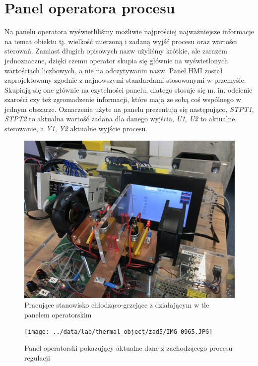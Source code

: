 \chapter{Panel operatora procesu}
\label{thermal_panel}
Na panelu operatora wyświetliliśmy możliwie najprościej najważniejsze informacje na temat obiektu tj. wielkość mierzoną i zadaną wyjść procesu oraz wartości sterowań. Zamiast długich opisowych nazw użyliśmy krótkie, ale zarazem jednoznaczne, dzięki czemu operator skupia się głównie na wyświetlonych wartościach liczbowych, a nie na odczytywaniu nazw. Panel HMI został zaprojektowany zgodnie z najnowszymi standardami stosowanymi w przemyśle. Skupiają się one głównie na czytelności panelu, dlatego stosuje się m. in. odcienie szarości czy też zgromadzenie informacji, które mają ze sobą coś wspólnego w jednym obszarze. Oznaczenie użyte na panelu prezentują się następująco, \textit{STPT1}, \textit{STPT2} to aktualna wartość zadana dla danego wyjścia, \textit{U1}, \textit{U2} to aktualne sterowanie, a \textit{Y1}, \textit{Y2} aktualne wyjście procesu. 

\begin{figure}[H]
\setlength{\leftskip}{-0.2cm}
\includegraphics[scale=0.09]{../data/lab/thermal_object/zad5/IMG_0964.JPG}
\caption{Pracujące stanowisko chłodząco-grzejące z działającym w tle panelem operatorskim}
\end{figure}

\begin{figure}[H]
\setlength{\leftskip}{-0.2cm}
\texttt{[image: ../data/lab/thermal\_object/zad5/IMG\_0965.JPG]}
\caption{Panel operatorski pokazujący aktualne dane z zachodzącego procesu regulacji}
\end{figure}

